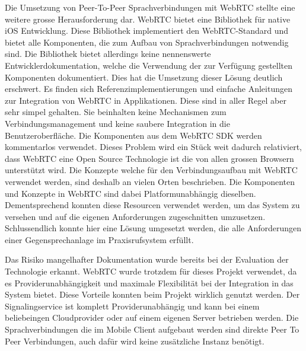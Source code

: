 Die Umsetzung von Peer-To-Peer Sprachverbindungen mit WebRTC stellte eine weitere grosse Herausforderung dar.
WebRTC bietet eine Bibliothek für native iOS Entwicklung.
Diese Bibliothek implementiert den WebRTC-Standard und bietet alle Komponenten, die zum Aufbau von Sprachverbindungen notwendig sind.
Die Bibliothek bietet allerdings keine nennenswerte Entwicklerdokumentation, welche die Verwendung der zur Verfügung gestellten Komponenten dokumentiert.
Dies hat die Umsetzung dieser Lösung deutlich erschwert.
Es finden sich Referenzimplementierungen und einfache Anleitungen zur Integration von WebRTC in Applikationen.
Diese sind in aller Regel aber sehr simpel gehalten.
Sie beinhalten keine Mechanismen zum Verbindungsmanagement und keine saubere Integration in die Benutzeroberfläche.
Die Komponenten aus dem WebRTC SDK werden kommentarlos verwendet.
Dieses Problem wird ein Stück weit dadurch relativiert, dass WebRTC eine Open Source Technologie ist die von allen grossen Browsern unterstützt wird.
Die Konzepte welche für den Verbindungsaufbau mit WebRTC verwendet werden, sind deshalb an vielen Orten beschrieben.
Die Komponenten und Konzepte in WebRTC sind dabei Platformunabhängig dieselben.
Dementsprechend konnten diese Resourcen verwendet werden, um das System zu versehen und auf die eigenen Anforderungen zugeschnitten umzusetzen.
Schlussendlich konnte hier eine Lösung umgesetzt werden, die alle Anforderungen einer Gegensprechanlage im Praxisrufsystem erfüllt.

Das Risiko mangelhafter Dokumentation wurde bereits bei der Evaluation der Technologie erkannt.
WebRTC wurde trotzdem für dieses Projekt verwendet, da es Providerunabhängigkeit und maximale Flexibilität bei der Integration in das System bietet.
Diese Vorteile konnten beim Projekt wirklich genutzt werden.
Der Signalingservice ist komplett Providerunabhängig und kann bei einem beliebeingen Cloudprovider oder auf einem eigenen Server betrieben werden.
Die Sprachverbindungen die im Mobile Client aufgebaut werden sind direkte Peer To Peer Verbindungen, auch dafür wird keine zusätzliche Instanz benötigt.

